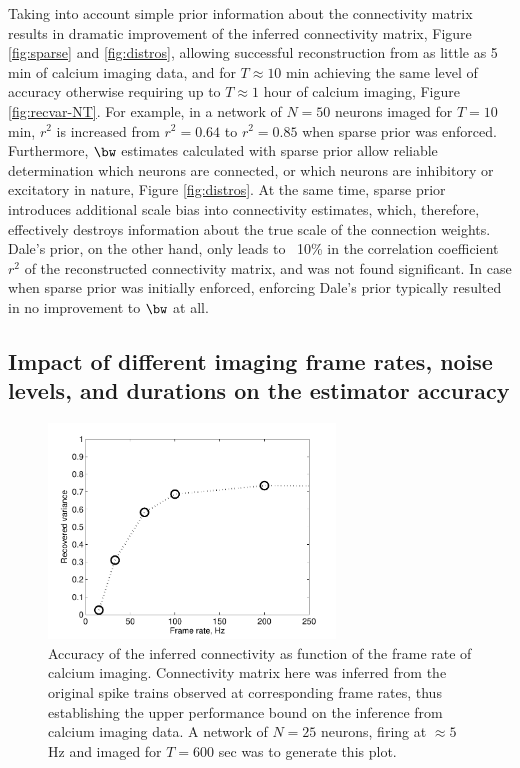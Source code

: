 Taking into account simple prior information about the connectivity matrix results in dramatic improvement of the inferred connectivity matrix, Figure \ref{fig:sparse} and \ref{fig:distros}, allowing successful reconstruction from as little as 5 min of calcium imaging data, and for $T\approx 10$ min achieving the same level of accuracy otherwise requiring up to $T\approx 1$ hour of calcium imaging, Figure \ref{fig:recvar-NT}.
For example, in a network of $N=50$ neurons imaged for $T=10$ min, $r^2$ is increased from $r^2=0.64$ to $r^2=0.85$ when sparse prior was enforced.
Furthermore, $\bw$ estimates calculated with sparse prior allow reliable determination which neurons are connected, or which neurons are inhibitory or excitatory in nature, Figure \ref{fig:distros}.
At the same time, sparse prior introduces additional scale bias into connectivity estimates, which, therefore, effectively destroys information about the true scale of the connection weights.
Dale's prior, on the other hand, only leads to ~10\% in the correlation coefficient $r^2$ of the reconstructed connectivity matrix, and was not found significant. In case when sparse prior was initially enforced, enforcing Dale's prior typically resulted in no improvement to $\bw$ at all.


\subsection{Impact of different imaging frame rates, noise levels, and durations on the estimator accuracy}

\begin{figure}[h]
\centering
\includegraphics[width=3in]{../figs/FigureA5_recvar}
\caption{Accuracy of the inferred connectivity as function of the frame rate of calcium imaging. Connectivity matrix here was inferred from the original spike trains observed at corresponding frame rates, thus establishing the upper performance bound on the inference from calcium imaging data. A network of $N=25$ neurons, firing at $\approx 5$ Hz and imaged for $T=600$ sec was to generate this plot.}
\label{fig:recvar}
\end{figure}


